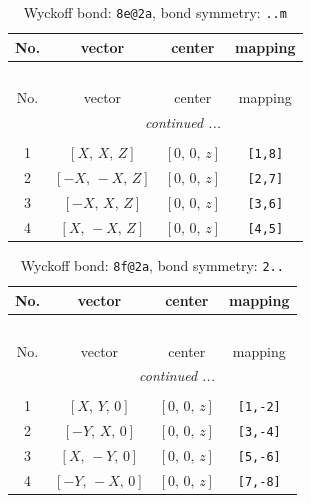 \documentclass[fleqn,8pt]{jsarticle}
\begin{document}
\renewcommand{\arraystretch}{1.2}
\begin{longtable}{cccc}
\caption{Wyckoff bond: {\tt 8e@2a}, bond symmetry: {\tt ..m}}
 \\
 \hline \hline
No. & vector & center & mapping \\ \hline \endfirsthead

\multicolumn{3}{l}{\tablename\ \thetable{}} \\
 \hline \hline
No. & vector & center & mapping \\ \hline \endhead

 \hline \hline
\multicolumn{3}{r}{\footnotesize\it continued ...} \\ \endfoot

 \hline \hline
\multicolumn{3}{r}{} \\ \endlastfoot

1 & $\left[ X,\, X,\, Z \right]$ & $\left[ 0,\, 0,\, z \right]$ & {\tt [1,8]} \\ \hline
2 & $\left[ - X,\, - X,\, Z \right]$ & $\left[ 0,\, 0,\, z \right]$ & {\tt [2,7]} \\ \hline
3 & $\left[ - X,\, X,\, Z \right]$ & $\left[ 0,\, 0,\, z \right]$ & {\tt [3,6]} \\ \hline
4 & $\left[ X,\, - X,\, Z \right]$ & $\left[ 0,\, 0,\, z \right]$ & {\tt [4,5]} \\
\end{longtable}
\renewcommand{\arraystretch}{1.2}
\begin{longtable}{cccc}
\caption{Wyckoff bond: {\tt 8f@2a}, bond symmetry: {\tt 2..}}
 \\
 \hline \hline
No. & vector & center & mapping \\ \hline \endfirsthead

\multicolumn{3}{l}{\tablename\ \thetable{}} \\
 \hline \hline
No. & vector & center & mapping \\ \hline \endhead

 \hline \hline
\multicolumn{3}{r}{\footnotesize\it continued ...} \\ \endfoot

 \hline \hline
\multicolumn{3}{r}{} \\ \endlastfoot

1 & $\left[ X,\, Y,\, 0 \right]$ & $\left[ 0,\, 0,\, z \right]$ & {\tt [1,-2]} \\ \hline
2 & $\left[ - Y,\, X,\, 0 \right]$ & $\left[ 0,\, 0,\, z \right]$ & {\tt [3,-4]} \\ \hline
3 & $\left[ X,\, - Y,\, 0 \right]$ & $\left[ 0,\, 0,\, z \right]$ & {\tt [5,-6]} \\ \hline
4 & $\left[ - Y,\, - X,\, 0 \right]$ & $\left[ 0,\, 0,\, z \right]$ & {\tt [7,-8]} \\
\end{longtable}
\end{document}
